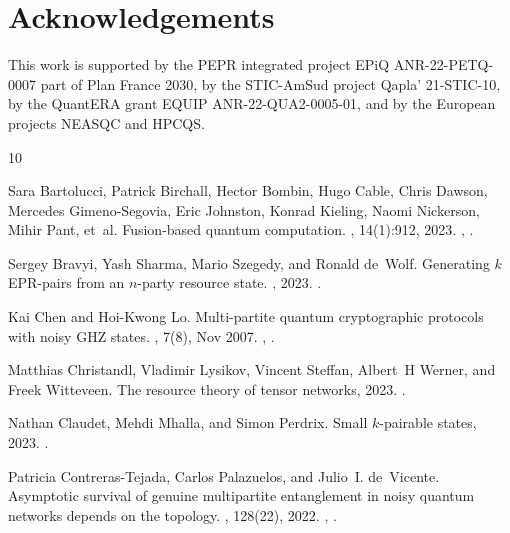 \documentclass[10pt,a4paper]{article}
\begin{document}
 \section*{Acknowledgements}
This work is supported by the PEPR integrated project EPiQ ANR-22-PETQ-0007 part of Plan France 2030, by the STIC-AmSud project Qapla’ 21-STIC-10, by the QuantERA grant EQUIP ANR-22-QUA2-0005-01, and by the European projects NEASQC and HPCQS.

\begin{thebibliography}{10}

Sara Bartolucci, Patrick Birchall, Hector Bombin, Hugo Cable, Chris Dawson,
  Mercedes Gimeno-Segovia, Eric Johnston, Konrad Kieling, Naomi Nickerson,
  Mihir Pant, et~al.
\newblock Fusion-based quantum computation.
, 14(1):912, 2023.
\newblock \href {https://arxiv.org/abs/2101.09310} {},
  \href {https://doi.org/10.1038/s41467-023-36493-1}
  {}.

Sergey Bravyi, Yash Sharma, Mario Szegedy, and Ronald de~Wolf.
\newblock Generating $ k $ {EPR}-pairs from an $n$-party resource state.
, 2023.
\newblock \href {https://arxiv.org/abs/2211.06497} {}.

Kai Chen and Hoi-Kwong Lo.
\newblock Multi-partite quantum cryptographic protocols with noisy {GHZ}
  states.
, 7(8), Nov 2007.
\newblock \href {https://arxiv.org/abs/quant-ph/0404133}
  {}, \href {https://doi.org/10.26421/QIC7.8-1}
  {}.

Matthias Christandl, Vladimir Lysikov, Vincent Steffan, Albert~H Werner, and
  Freek Witteveen.
\newblock The resource theory of tensor networks, 2023.
\newblock \href {https://arxiv.org/abs/2307.07394} {}.

Nathan Claudet, Mehdi Mhalla, and Simon Perdrix.
\newblock Small $k$-pairable states, 2023.
\newblock \href {https://arxiv.org/abs/2309.09956} {}.

Patricia Contreras-Tejada, Carlos Palazuelos, and Julio~I. de~Vicente.
\newblock Asymptotic survival of genuine multipartite entanglement in noisy
  quantum networks depends on the topology.
, 128(22), 2022.
\newblock \href {https://arxiv.org/abs/2106.04634} {},
  \href {https://doi.org/10.1103/physrevlett.128.220501}
  {}.


\end{thebibliography}
\end{document}
